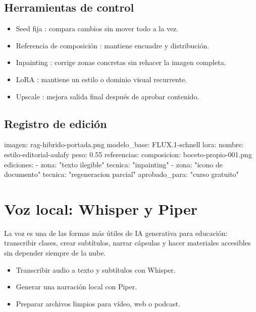\documentclass[11pt,a4paper]{book}
\begin{document}
\section{Herramientas de control}
\begin{itemize}\item Seed fija : compara cambios sin mover todo a la vez.\end{itemize}
\begin{itemize}\item Referencia de composición : mantiene encuadre y distribución.\end{itemize}
\begin{itemize}\item Inpainting : corrige zonas concretas sin rehacer la imagen completa.\end{itemize}
\begin{itemize}\item LoRA : mantiene un estilo o dominio visual recurrente.\end{itemize}
\begin{itemize}\item Upscale : mejora salida final después de aprobar contenido.\end{itemize}
\section{Registro de edición}
\begin{codebox}
imagen: rag-hibrido-portada.png
modelo_base: FLUX.1-schnell
lora:
  nombre: estilo-editorial-aulafy
  peso: 0.55
referencias:
  composicion: boceto-propio-001.png
ediciones:
  - zona: "texto ilegible"
    tecnica: "inpainting"
  - zona: "icono de documento"
    tecnica: "regeneracion parcial"
aprobado_para: "curso gratuito"
\end{codebox}
\chapter{Voz local: Whisper y Piper}
La voz es una de las formas más útiles de IA generativa para educación: transcribir clases, crear subtítulos, narrar cápsulas y hacer materiales accesibles sin depender siempre de la nube.

\begin{itemize}\item Transcribir audio a texto y subtítulos con Whisper.\end{itemize}
\begin{itemize}\item Generar una narración local con Piper.\end{itemize}
\begin{itemize}\item Preparar archivos limpios para vídeo, web o podcast.\end{itemize}
\end{document}

